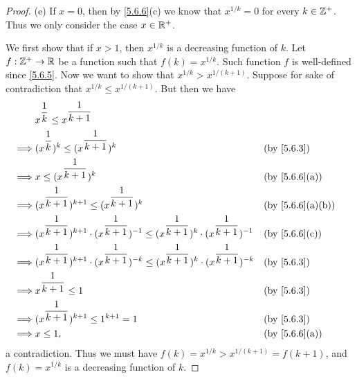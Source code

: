 \begin{proof}{(e)}
  If \(x = 0\), then by \cref{5.6.6}(c) we know that \(x^{1 / k} = 0\) for every \(k \in \mathbb{Z}^+\).
  Thus we only consider the case \(x \in \mathbb{R}^+\).

  We first show that if \(x > 1\), then \(x^{1 / k}\) is a decreasing function of \(k\).
  Let \(f : \mathbb{Z}^+ \to \mathbb{R}\) be a function such that \(f(k) = x^{1 / k}\).
  Such function \(f\) is well-defined since \cref{5.6.5}.
  Now we want to show that \(x^{1 / k} > x^{1 / (k + 1)}\).
  Suppose for sake of contradiction that \(x^{1 / k} \leq x^{1 / (k + 1)}\).
  But then we have
  \begin{align*}
             & x^{\dfrac{1}{k}} \leq x^{\dfrac{1}{k + 1}}                                                                                                            \\
    \implies & (x^{\dfrac{1}{k}})^k \leq (x^{\dfrac{1}{k + 1}})^k                                                                               &  & \by{5.6.3}      \\
    \implies & x \leq (x^{\dfrac{1}{k + 1}})^k                                                                                                  &  & \by{5.6.6}[a]   \\
    \implies & (x^{\dfrac{1}{k + 1}})^{k + 1} \leq (x^{\dfrac{1}{k + 1}})^k                                                                     &  & \by{5.6.6}[a,b] \\
    \implies & (x^{\dfrac{1}{k + 1}})^{k + 1} \cdot (x^{\dfrac{1}{k + 1}})^{-1} \leq (x^{\dfrac{1}{k + 1}})^k \cdot (x^{\dfrac{1}{k + 1}})^{-1} &  & \by{5.6.6}[c]   \\
    \implies & (x^{\dfrac{1}{k + 1}})^{k + 1} \cdot (x^{\dfrac{1}{k + 1}})^{-k} \leq (x^{\dfrac{1}{k + 1}})^k \cdot (x^{\dfrac{1}{k + 1}})^{-k} &  & \by{5.6.3}      \\
    \implies & x^{\dfrac{1}{k + 1}} \leq 1                                                                                                      &  & \by{5.6.3}      \\
    \implies & (x^{\dfrac{1}{k + 1}})^{k + 1} \leq 1^{k + 1} = 1                                                                                &  & \by{5.6.3}      \\
    \implies & x \leq 1,                                                                                                                        &  & \by{5.6.6}[a]
  \end{align*}
  a contradiction.
  Thus we must have \(f(k) = x^{1 / k} > x^{1 / (k + 1)} = f(k + 1)\), and \(f(k) = x^{1 / k}\) is a decreasing function of \(k\).


\end{proof}
